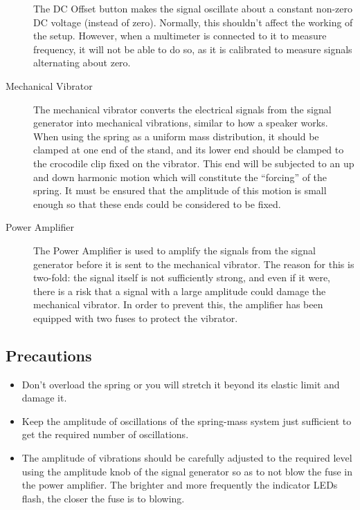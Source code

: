 \begin{refsection}
\begin{description}
\begin{tip}
The DC Offset button makes the signal oscillate about a constant non-zero DC voltage (instead of zero). Normally, this shouldn't affect the working of the setup. However, when a multimeter is connected to it to measure frequency, it will not be able to do so, as it is calibrated to measure signals alternating about zero.
\end{tip}

\item[Mechanical Vibrator]

The mechanical vibrator converts the electrical signals from the signal generator into mechanical vibrations, similar to how a speaker works. When using the spring as a uniform mass distribution, it should be clamped at one end of the stand, and its lower end should be clamped to the crocodile clip fixed on the vibrator. This end will be subjected to an up and down harmonic motion which will constitute the ``forcing'' of the spring. It must be ensured that the amplitude of this motion is small enough so that these ends could be considered to be fixed.


\item[Power Amplifier]

The Power Amplifier is used to amplify the signals from the signal generator before it is sent to the mechanical vibrator. The reason for this is two-fold: the signal itself is not sufficiently strong, and even if it were, there is a risk that a signal with a large amplitude could damage the mechanical vibrator. In order to prevent this, the amplifier has been equipped with two fuses to protect the vibrator.

\end{description}





\subsection*{Precautions}

\begin{itemize}
\item Don't overload the spring or you will stretch it beyond its elastic limit and damage it.
\item Keep the amplitude of oscillations of the spring-mass system just sufficient to get the required number of oscillations.
\item The amplitude of vibrations should be carefully adjusted to the required level using the amplitude knob of the signal generator so as to not blow the fuse in the power amplifier. The brighter and more frequently the indicator LEDs flash, the closer the fuse is to blowing.
\end{itemize}


\end{refsection}
